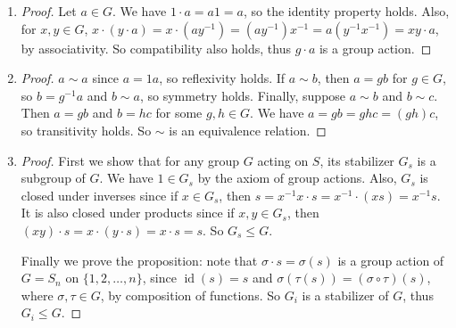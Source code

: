 \documentclass[11pt, letterpaper]{article}
\begin{document}
\begin{enumerate}
\begin{proof}
    $(\leftarrow)$ Suppose $G$ is Abelian. Let $a, b \in G$. Then $\varphi(ab) = (ab)^2 = a^2b^2 = \varphi(a)\varphi(b)$.
  \end{proof}

  \item \begin{proof}
    Let $a \in G$. We have $1 \cdot a = a1 = a$, so the identity property holds. Also, for $x, y \in G$, $x \cdot (y \cdot a) = x \cdot (ay^{-1}) = (ay^{-1})x^{-1} = a(y^{-1}x^{-1}) = xy \cdot a$, by associativity. So compatibility also holds, thus $g \cdot a$ is a group action. 
  \end{proof}

  \item \begin{proof}
    $a \sim a$ since $a = 1a$, so reflexivity holds. If $a \sim b$, then $a = gb$ for $g \in G$, so $b = g^{-1}a$ and $b \sim a$, so symmetry holds. Finally, suppose $a \sim b$ and $b \sim c$. Then $a = gb$ and $b = hc$ for some $g, h \in G$. We have $a = gb = ghc = (gh)c$, so transitivity holds. So $\sim$ is an equivalence relation.
  \end{proof}

  \item \begin{proof}
    First we show that for any group $G$ acting on $S$, its stabilizer $G_s$ is a subgroup of $G$. We have $1 \in G_s$ by the axiom of group actions. Also, $G_s$ is closed under inverses since if $x \in G_s$, then $s = x^{-1}x \cdot s = x^{-1} \cdot (xs) = x^{-1}s$. It is also closed under products since if $x, y \in G_s$, then $(xy) \cdot s = x \cdot (y \cdot s) = x \cdot s = s$. So $G_s \leq G$.

    Finally we prove the proposition: note that $\sigma \cdot s = \sigma(s)$ is a group action of $G = S_n$ on $\lbrace 1, 2, \dots , n \rbrace$, since $\operatorname{id}(s) = s$ and $\sigma(\tau(s)) = (\sigma \circ \tau)(s)$, where $\sigma, \tau \in G$, by composition of functions. So $G_i$ is a stabilizer of $G$, thus $G_i \leq G$.
  \end{proof}

\end{enumerate}
\end{document}
